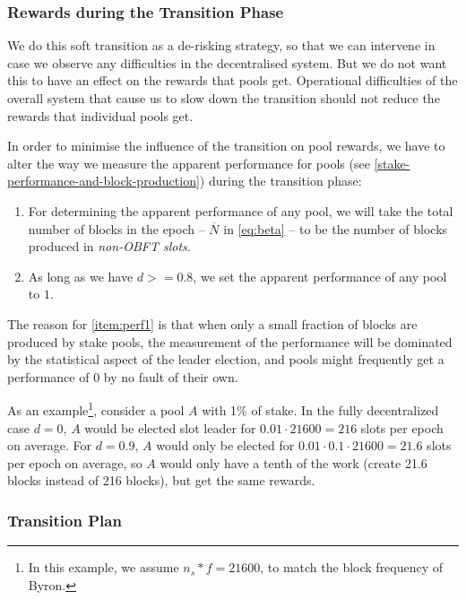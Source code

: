 \documentclass[11pt,a4paper,dvipsnames,twosided]{article}
\newcommand\Nbar{\overline{N}}
\begin{document}
\subsubsection{Rewards during the Transition Phase}
\label{rewards-during-the-transition-phase}

We do this soft transition as a de-risking strategy, so that we can intervene in
case we observe any difficulties in the decentralised system. But we do not want
this to have an effect on the rewards that pools get. Operational difficulties
of the overall system that cause us to slow down the transition should not
reduce the rewards that individual pools get.

In order to minimise the influence of the transition on pool rewards, we have to
alter the way we measure the apparent performance for pools (see
\cref{stake-performance-and-block-production}) during the transition phase:
\begin{enumerate}
  \item
    For determining the apparent performance of any pool, we will take the total
    number of blocks in the epoch -- \(\Nbar\) in \cref{eq:beta} -- to be the
    number of blocks produced in \emph{non-OBFT slots}.
  \item
    As long as we have \(d >= 0.8\), we set the apparent performance of any pool
    to \(1\).
    \label{item:perf1}
\end{enumerate}
The reason for \cref{item:perf1} is that when only a small fraction of blocks
are produced by stake pools, the measurement of the performance will be
dominated by the statistical aspect of the leader election, and pools might
frequently get a performance of \(0\) by no fault of their own.

As an example\footnote{In this example, we assume \(n_s*f=21600\), to match the
  block frequency of Byron.}, consider a pool \(A\) with 1\% of stake. In the
fully decentralized case \(d=0\), \(A\) would be elected slot leader for
\(0.01\cdot 21600=216\) slots per epoch on average. For \(d=0.9\), \(A\) would
only be elected for \(0.01\cdot 0.1\cdot 21600=21.6\) slots per epoch on
average, so \(A\) would only have a tenth of the work (create 21.6 blocks
instead of 216 blocks), but get the same rewards.

\subsubsection{Transition Plan}
\label{transition-plan}
\end{document}

